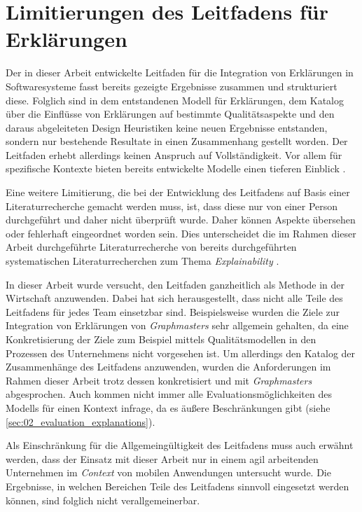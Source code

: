 \section{Limitierungen des Leitfadens für Erklärungen}

Der in dieser Arbeit entwickelte Leitfaden für die Integration von Erklärungen in Softwaresysteme fasst bereits gezeigte Ergebnisse zusammen und strukturiert diese. Folglich sind in dem entstandenen Modell für Erklärungen, dem Katalog über die Einflüsse von Erklärungen auf bestimmte Qualitätsaspekte und den daraus abgeleiteten Design Heuristiken keine neuen Ergebnisse entstanden, sondern nur bestehende Resultate in einen Zusammenhang gestellt worden. 
Der Leitfaden erhebt allerdings keinen Anspruch auf Vollständigkeit. Vor allem für spezifische Kontexte bieten bereits entwickelte Modelle einen tieferen Einblick \cite{nunes_systematic_2017, sokol_explainability_2020}.

Eine weitere Limitierung, die bei der Entwicklung des Leitfadens auf Basis einer Literaturrecherche gemacht werden muss, ist, dass diese nur von einer Person durchgeführt und daher nicht überprüft wurde. Daher können Aspekte übersehen oder fehlerhaft eingeordnet worden sein. Dies unterscheidet die im Rahmen dieser Arbeit durchgeführte Literaturrecherche von bereits durchgeführten systematischen Literaturrecherchen zum Thema \textit{Explainability} \cite[vgl.][]{nunes_systematic_2017,chazette_knowledge_nodate}.

In dieser Arbeit wurde versucht, den Leitfaden ganzheitlich als Methode in der Wirtschaft anzuwenden. Dabei hat sich herausgestellt, dass nicht alle Teile des Leitfadens für jedes Team einsetzbar sind. Beispielsweise wurden die Ziele zur Integration von Erklärungen von \textit{Graphmasters} sehr allgemein gehalten, da eine Konkretisierung der Ziele zum Beispiel mittels Qualitätsmodellen \cite{schneider2012abenteuer} in den Prozessen des Unternehmens nicht vorgesehen ist. Um allerdings den Katalog der Zusammenhänge des Leitfadens anzuwenden, wurden die Anforderungen im Rahmen dieser Arbeit trotz dessen konkretisiert und mit \textit{Graphmasters} abgesprochen. Auch kommen nicht immer alle Evaluationsmöglichkeiten des Modells für einen Kontext infrage, da es äußere Beschränkungen gibt (siehe \autoref{sec:02_evaluation_explanations}).

Als Einschränkung für die Allgemeingültigkeit des Leitfadens muss auch erwähnt werden, dass der Einsatz mit dieser Arbeit nur in einem agil arbeitenden Unternehmen im \textit{Context} von mobilen Anwendungen untersucht wurde. Die Ergebnisse, in welchen Bereichen Teile des Leitfadens sinnvoll eingesetzt werden können, sind folglich nicht verallgemeinerbar.


